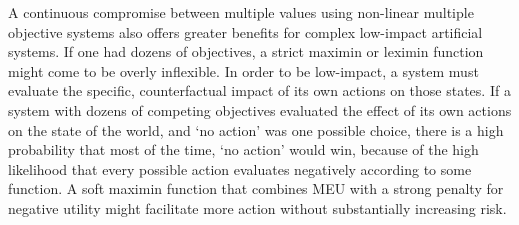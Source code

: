 A continuous compromise between multiple values using non-linear multiple objective systems also offers greater benefits for complex low-impact artificial systems. If one had dozens of objectives, a strict maximin or leximin function might come to be overly inflexible. In order to be low-impact, a system must evaluate the specific, counterfactual impact of its own actions on those states. If a system with dozens of competing objectives evaluated the effect of its own actions on the state of the world, and `no action' was one possible choice, there is a high probability that most of the time, `no action' would win, because of the high likelihood that every possible action evaluates negatively according to some function. A soft maximin function that combines MEU with a strong penalty for negative utility might facilitate more action without substantially increasing risk.
